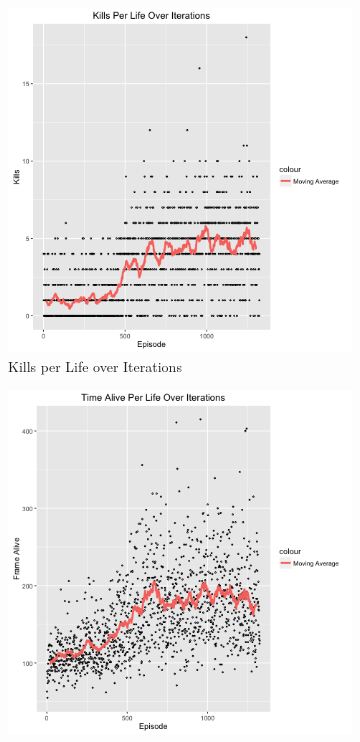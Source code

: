 \documentclass{article}
\begin{document}
\begin{multicols}{2}
\begin{figure}[H]
\captionsetup{justification=centering}
\caption{Results for Baseline}
\begin{subfigure}{.25\textwidth}
  \centering
  \includegraphics[scale=0.27]{./kills.png}
  \caption{Kills per Life over Iterations}
\end{subfigure}
\begin{subfigure}{.25\textwidth}
  \centering
  \includegraphics[scale=0.27]{./time.png}

\end{subfigure}
\end{figure}
\end{multicols}
\end{document}
